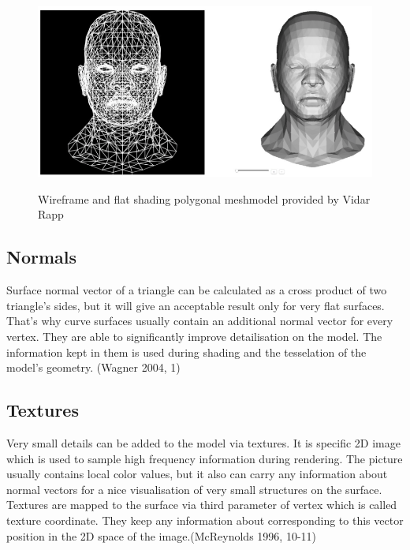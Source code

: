 \documentclass[twoside, english, 11pt]{report}
\begin{document}
\begin{figure}[!h]
\includegraphics[scale=0.55]{img/mesh}\\
\caption{Wireframe and flat shading polygonal meshmodel provided by Vidar Rapp\label{fig:mesh}}
\end{figure}

\subsection{Normals}
Surface normal vector of a triangle can be calculated as a cross product of two triangle's sides, but it will give an acceptable result only for very flat surfaces. That's why curve surfaces usually contain an additional normal vector for every vertex. They are able to significantly improve detailisation on the model. The information kept in them is used during shading and the tesselation of the model's geometry. (Wagner 2004, 1)\\


\subsection{Textures}
Very small details can be added to the model via textures. It is specific 2D image which is used to sample high frequency information during rendering. The picture usually contains local color values, but it also can carry any information about normal vectors for a nice visualisation of very small structures on the surface. Textures are mapped to the surface via third parameter of vertex which is called texture coordinate. They keep any information about corresponding to this vector position in the 2D space of the image.(McReynolds 1996, 10-11)\\
\end{document}

